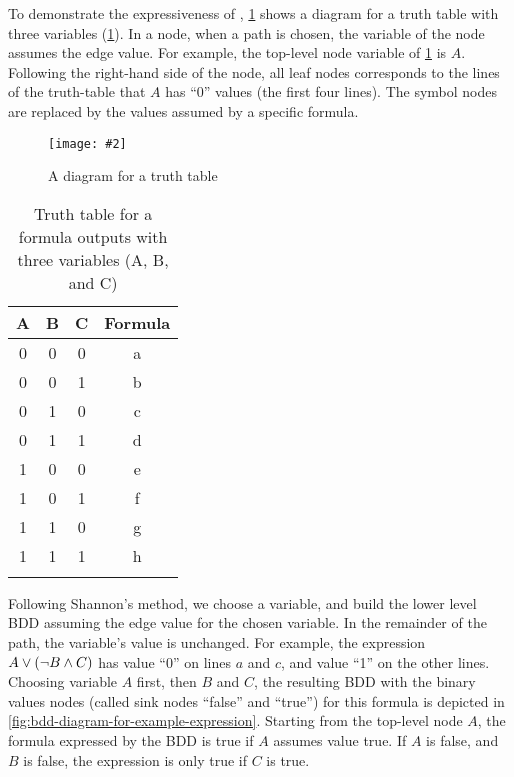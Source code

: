 \documentclass[en,twoside,onehalfspacing,phd]{risethesis}
\newcommand{\includegraphicsaspectratio}[2][1]{%
  \texttt{[image: \#2]}%
}
\newcommand{\parsin}[1]{\ensuremath\left( #1 \right)}
\begin{document}
To demonstrate the expressiveness of , \cref{fig:bdd-diagram-for-a-truth-table} shows a diagram for a truth table with three variables (\cref{tbl:bdd-truth-table-with-three-variable}).
In a node, when a path is chosen, the variable of the node assumes the edge value.
For example, the top-level node variable of \cref{fig:bdd-diagram-for-a-truth-table} is $A$.
Following the right-hand side of the node, all leaf nodes corresponds to the lines of the truth-table that $A$ has ``0'' values (the first four lines).
The symbol nodes are replaced by the values assumed by a specific formula.

\begin{figure}[t]
  \centering
  \includegraphicsaspectratio[0.5]{bdd-diagram-for-a-truth-table}
  \caption{A diagram for a truth table}
  \label{fig:bdd-diagram-for-a-truth-table}
\end{figure}

\begin{table}[t]
  \caption{Truth table for a formula outputs with three variables (A, B, and C)}
  \label{tbl:bdd-truth-table-with-three-variable}
  \centering
  {\footnotesize
  \begin{tabular}{cccc}
    \hline\noalign{\smallskip}
    \textbf{A} & \textbf{B} & \textbf{C} & \textbf{Formula}\\
    \hline\noalign{\smallskip}\hline\noalign{\smallskip}
    0 & 0 & 0 & a \\
    0 & 0 & 1 & b \\
    0 & 1 & 0 & c \\
    0 & 1 & 1 & d \\
    1 & 0 & 0 & e \\
    1 & 0 & 1 & f \\
    1 & 1 & 0 & g \\
    1 & 1 & 1 & h \\
    \hline\noalign{\smallskip}
  \end{tabular}
  }
\end{table}

Following Shannon's method, we choose a variable, and build the lower level \ac{BDD} assuming the edge value for the chosen variable.
In the remainder of the path, the variable's value is unchanged.
For example, the expression $A \lor \parsin{\lnot B \land C}$ has value ``0'' on lines $a$ and $c$, and value ``1'' on the other lines.
Choosing variable $A$ first, then $B$ and $C$, the resulting \ac{BDD} with the binary values nodes (called sink nodes ``false'' and ``true'') for this formula is depicted in \cref{fig:bdd-diagram-for-example-expression}.
Starting from the top-level node $A$, the formula expressed by the \ac{BDD} is true if $A$ assumes value true. 
If $A$ is false, and $B$ is false, the expression is only true if $C$ is true.
\end{document}
